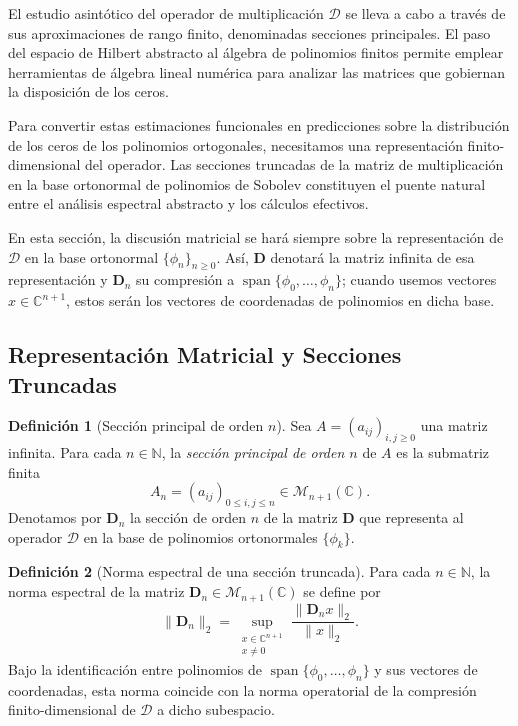 \documentclass[12pt,a4paper]{article}
\theoremstyle{definition}
\newtheorem{definition}{Definición}
\theoremstyle{remark}
\newcommand{\D}{\mathcal{D}}
\begin{document}
El estudio asintótico del operador de multiplicación $\D$ se lleva a cabo a través de sus aproximaciones de rango finito, denominadas secciones principales. El paso del espacio de Hilbert abstracto al álgebra de polinomios finitos permite emplear herramientas de álgebra lineal numérica para analizar las matrices que gobiernan la disposición de los ceros.

Para convertir estas estimaciones funcionales en predicciones sobre la distribución de los ceros de los polinomios ortogonales, necesitamos una representación finito-dimensional del operador. Las secciones truncadas de la matriz de multiplicación en la base ortonormal de polinomios de Sobolev constituyen el puente natural entre el análisis espectral abstracto y los cálculos efectivos.

En esta sección, la discusión matricial se hará siempre sobre la representación de $\D$ en la base ortonormal $\{\phi_n\}_{n\ge 0}$. Así, $\mathbf{D}$ denotará la matriz infinita de esa representación y $\mathbf{D}_n$ su compresión a $\operatorname{span}\{\phi_0,\dots,\phi_n\}$; cuando usemos vectores $x \in \mathbb{C}^{n+1}$, estos serán los vectores de coordenadas de polinomios en dicha base.

\subsection{Representación Matricial y Secciones Truncadas}

\begin{definition}[Sección principal de orden $n$]\label{def:seccion_truncada}
  Sea $A = (a_{ij})_{i,j \geq 0}$ una matriz infinita. Para cada $n \in \mathbb{N}$, la \emph{sección principal de orden $n$} de $A$ es la submatriz finita
  \[
    A_n = (a_{ij})_{0 \leq i,j \leq n} \in \mathcal{M}_{n+1}(\mathbb{C}).
  \]
  Denotamos por $\mathbf{D}_n$ la sección de orden $n$ de la matriz $\mathbf{D}$ que representa al operador $\D$ en la base de polinomios ortonormales $\{\phi_k\}$.
\end{definition}

\begin{definition}[Norma espectral de una sección truncada]\label{def:norma_espectral_truncada}
  Para cada $n \in \mathbb{N}$, la norma espectral de la matriz $\mathbf{D}_n \in \mathcal{M}_{n+1}(\mathbb{C})$ se define por
  \[
    \|\mathbf{D}_n\|_2 = \sup_{\substack{x \in \mathbb{C}^{n+1} \\ x \neq 0}} \frac{\|\mathbf{D}_n x\|_2}{\|x\|_2}.
  \]
  Bajo la identificación entre polinomios de $\operatorname{span}\{\phi_0,\dots,\phi_n\}$ y sus vectores de coordenadas, esta norma coincide con la norma operatorial de la compresión finito-dimensional de $\D$ a dicho subespacio.
\end{definition}
\end{document}
